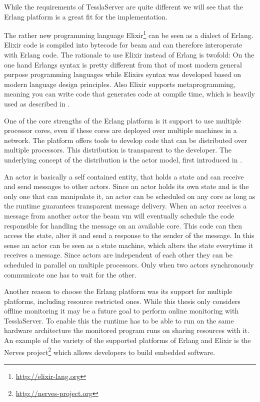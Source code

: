 While the requirements of TesslaServer are quite different we will see that the Erlang platform is a great fit for the implementation.

The rather new programming language Elixir\footnote{\url{http://elixir-lang.org}} can be seen as a dialect of Erlang.
Elixir code is compiled into bytecode for \gls{beam} and can therefore interoperate with Erlang code.
The rationale to use Elixir instead of Erlang is twofold:
On the one hand Erlangs syntax is pretty different from that of most modern general purpose programming languages while Elixirs syntax was developed based on modern language design principles.
Also Elixir supports metaprogramming, meaning you can write code that generates code at compile time, which is heavily used as described in .

One of the core strengths of the Erlang platform is it support to use multiple processor cores, even if these cores are deployed over multiple machines in a network.
The platform offers tools to develop code that can be distributed over multiple processors.
This distribution is transparent to the developer.
The underlying concept of the distribution is the actor model, first introduced in \cite{Hewitt1973}.

An actor is basically a self contained entity, that holds a state and can receive and send messages to other actors.
Since an actor holds its own state and is the only one that can manipulate it, an actor can be scheduled on any core as long as the runtime guarantees transparent message delivery.
When an actor receives a message from another actor the \gls{beam} \gls{vm} will eventually schedule the code responsible for handling the message on an available core.
This code can then access the state, alter it and send a response to the sender of the message.
In this sense an actor can be seen as a state machine, which alters the state everytime it receives a message.
Since actors are independent of each other they can be scheduled in parallel on multiple processors.
Only when two actors synchronously communicate one has to wait for the other.


Another reason to choose the Erlang platform was its support for multiple platforms, including resource restricted ones.
While this thesis only considers offline monitoring it may be a future goal to perform online monitoring with TesslaServer.
To enable this the runtime has to be able to run on the same hardware architecture the monitored program runs on sharing resources with it.
An example of the variety of the supported platforms of Erlang and Elixir is the Nerves project\footnote{\url{http://nerves-project.org}} which allows developers to build embedded software.

